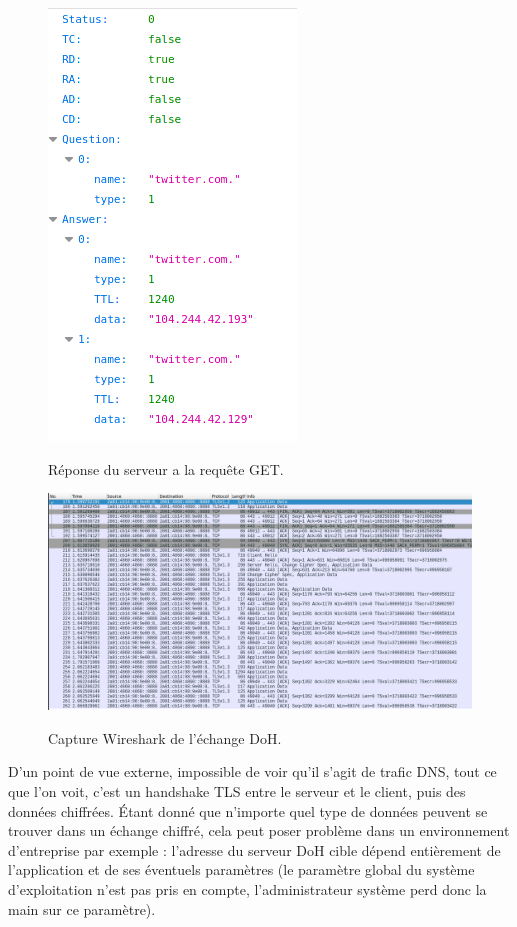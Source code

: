 \documentclass[a4paper,12pt]{article}
\begin{document}
	\begin{figure}[H]
		\begin{center}
			{\includegraphics[scale=0.6]{Images/out_json.png}}
		\end{center}
		\caption{Réponse du serveur a la requête GET.}
	\end{figure}
	
	
 	\begin{figure}[H]
	 	\begin{center}
	 		{\includegraphics[scale=0.55]{Images/doh-wireshark.png}}
	 	\end{center}
	 	\caption{Capture Wireshark de l'échange DoH.}
	\end{figure}

	D'un point de vue externe, impossible de voir qu'il s'agit de trafic DNS, tout ce que l'on voit, c'est un handshake TLS entre le serveur et le client, puis des données chiffrées. Étant donné que n'importe quel type de données peuvent se trouver dans un échange chiffré, cela peut poser problème dans un environnement d'entreprise par exemple : l'adresse du serveur DoH cible dépend entièrement de l'application et de ses éventuels paramètres (le paramètre global du système d'exploitation n'est pas pris en compte, l'administrateur système perd donc la main sur ce paramètre). 
	
\end{document}
